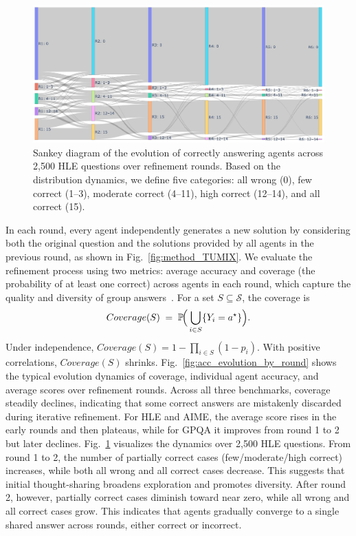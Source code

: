 \begin{figure}[ht]
  \centering
  \includegraphics[width=0.9\linewidth]{Figures/sankey.pdf}
   \caption{Sankey diagram of the evolution of correctly answering agents across 2,500 HLE questions over refinement rounds. Based on the distribution dynamics, we define five categories: all wrong (0), few correct (1–3), moderate correct (4–11), high correct (12–14), and all correct (15).}
   \label{fig:sankey}
   \vspace{-12pt}
\end{figure}

In each round, every agent independently generates a new solution by considering both the original question and the solutions provided by all agents in the previous round, as shown in Fig.~\ref{fig:method_TUMIX}. We evaluate the refinement process using two metrics: average accuracy and coverage (the probability of at least one correct) across agents in each round, which capture the quality and diversity of group answers~\citep{LLM-monkey}. For a set \(S\subseteq\mathcal{S}\), the coverage is
\begin{equation}
  Coverage(S) \;=\; \mathbb{P}\!\Big( \bigcup_{i\in S} \{Y_i = a^\star\} \Big).
\end{equation}
Under independence, \(Coverage(S) = 1-\prod_{i\in S}(1-p_i)\). With positive correlations, \(Coverage(S)\) shrinks. Fig.~\ref{fig:acc_evolution_by_round} shows the typical evolution dynamics of coverage, individual agent accuracy, and average scores over refinement rounds. Across all three benchmarks, coverage steadily declines, indicating that some correct answers are mistakenly discarded during iterative refinement. For HLE and AIME, the average score rises in the early rounds and then plateaus, while for GPQA it improves from round 1 to 2 but later declines. Fig.~\ref{fig:sankey} visualizes the dynamics over 2,500 HLE questions. From round 1 to 2, the number of partially correct cases (few/moderate/high correct) increases, while both all wrong and all correct cases decrease. This suggests that initial thought-sharing broadens exploration and promotes diversity. After round 2, however, partially correct cases diminish toward near zero, while all wrong and all correct cases grow. This indicates that agents gradually converge to a single shared answer across rounds, either correct or incorrect.

